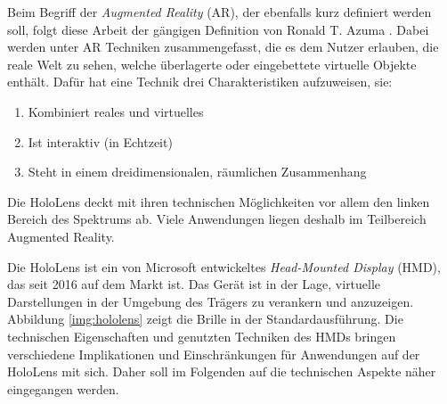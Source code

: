 Beim Begriff der \textit{Augmented Reality} (AR), der ebenfalls kurz definiert werden soll, folgt diese Arbeit der gängigen Definition von Ronald T. Azuma \cite{Azuma97}. Dabei werden unter AR Techniken zusammengefasst, die es dem Nutzer erlauben, die reale Welt zu sehen, welche überlagerte oder eingebettete virtuelle Objekte enthält. Dafür hat eine Technik drei Charakteristiken aufzuweisen, sie:
\begin{enumerate}
	\setlength{\itemsep}{-5pt}
	\item Kombiniert reales und virtuelles
	\item Ist interaktiv (in Echtzeit)
	\item Steht in einem dreidimensionalen, räumlichen Zusammenhang
\end{enumerate}

Die HoloLens deckt mit ihren technischen Möglichkeiten vor allem den linken Bereich des Spektrums ab. Viele Anwendungen liegen deshalb im Teilbereich Augmented Reality.

Die HoloLens ist ein von Microsoft entwickeltes \textit{Head-Mounted Display} (HMD), das seit 2016 auf dem Markt ist. Das Gerät ist in der Lage, virtuelle Darstellungen in der Umgebung des Trägers zu verankern und anzuzeigen. Abbildung \ref{img:hololens} zeigt die Brille in der Standardausführung. Die technischen Eigenschaften und genutzten Techniken des HMDs bringen verschiedene Implikationen und Einschränkungen für Anwendungen auf der HoloLens mit sich. Daher soll im Folgenden auf die technischen Aspekte näher eingegangen werden.\\

